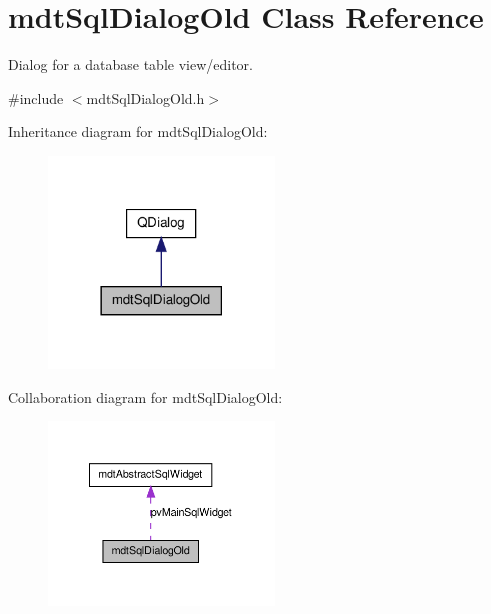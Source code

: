 \hypertarget{classmdt_sql_dialog_old}{\section{mdt\-Sql\-Dialog\-Old Class Reference}
\label{classmdt_sql_dialog_old}
}


Dialog for a database table view/editor.  




{\ttfamily \#include $<$mdt\-Sql\-Dialog\-Old.\-h$>$}



Inheritance diagram for mdt\-Sql\-Dialog\-Old\-:\nopagebreak
\begin{figure}[H]
\begin{center}
\leavevmode
\includegraphics[width=170pt]{classmdt_sql_dialog_old__inherit__graph}
\end{center}
\end{figure}


Collaboration diagram for mdt\-Sql\-Dialog\-Old\-:\nopagebreak
\begin{figure}[H]
\begin{center}
\leavevmode
\includegraphics[width=170pt]{classmdt_sql_dialog_old__coll__graph}
\end{center}
\end{figure}
